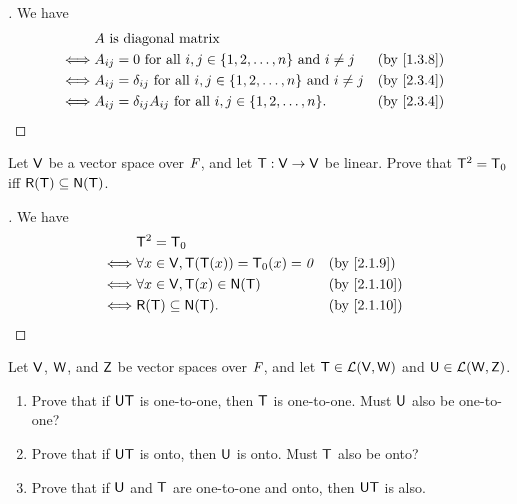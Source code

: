 \begin{proof}[]
	We have
	\begin{align*}
		     & A \text{ is diagonal matrix}                                                                                \\
		\iff & A_{i j} = 0 \text{ for all } i, j \in \set{1, 2, \dots, n} \text{ and } i \neq j            &  & \by{1.3.8} \\
		\iff & A_{i j} = \delta_{i j} \text{ for all } i, j \in \set{1, 2, \dots, n} \text{ and } i \neq j &  & \by{2.3.4} \\
		\iff & A_{i j} = \delta_{i j} A_{i j} \text{ for all } i, j \in \set{1, 2, \dots, n}.              &  & \by{2.3.4}
	\end{align*}
\end{proof}

\begin{ex}\label{ex:2.3.11}
	Let \(\mathsf{V}\) be a vector space over \(\mathit{F}\), and let \(\mathsf{T} : \mathsf{V} \to \mathsf{V}\) be linear.
	Prove that \(\mathsf{T}^2 = \mathsf{T}_0\) iff \(\rg{\T} \subseteq \ns{\T}\).
\end{ex}

\begin{proof}[]
	We have
	\begin{align*}
		     & \T^2 = \zT                                                  \\
		\iff & \forall x \in \V, \T(\T(x)) = \zT(x) = \zv &  & \by{2.1.9}  \\
		\iff & \forall x \in \V, \T(x) \in \ns{\T}        &  & \by{2.1.10} \\
		\iff & \rg{\T} \subseteq \ns{\T}.                 &  & \by{2.1.10}
	\end{align*}
\end{proof}

\begin{ex}\label{ex:2.3.12}
	Let \(\mathsf{V}\), \(\mathsf{W}\), and \(\mathsf{Z}\) be vector spaces over \(\mathit{F}\), and let \(\mathsf{T} \in \mathcal{L}(\mathsf{V}, \mathsf{W})\) and \(\mathsf{U} \in \mathcal{L}(\mathsf{W}, \mathsf{Z})\).
	\begin{enumerate}
		\item Prove that if \(\mathsf{U} \mathsf{T}\) is one-to-one, then \(\mathsf{T}\) is one-to-one.
		      Must \(\mathsf{U}\) also be one-to-one?
		\item Prove that if \(\mathsf{U} \mathsf{T}\) is onto, then \(\mathsf{U}\) is onto.
		      Must \(\mathsf{T}\) also be onto?
		\item Prove that if \(\mathsf{U}\) and \(\mathsf{T}\) are one-to-one and onto, then \(\mathsf{U} \mathsf{T}\) is also.
	\end{enumerate}
\end{ex}

